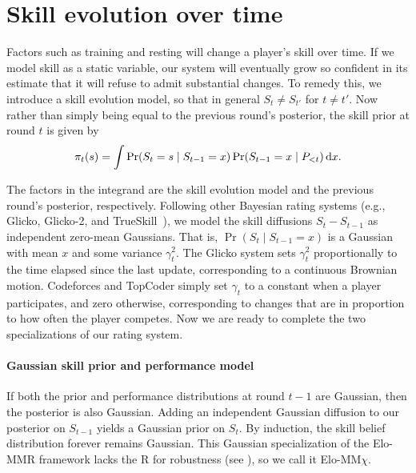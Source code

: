 \section{Skill evolution over time}
\label{sec:skill-drift}

Factors such as training and resting will change a player's skill over time. If we model skill as a static variable, our system will eventually grow so confident in its estimate that it will refuse to admit substantial changes. To remedy this, we introduce a skill evolution model, so that in general $S_t \neq S_{t'}$ for $t \neq t'$. Now rather than simply being equal to the previous round's posterior, the skill prior at round $t$ is given by
\begin{equation}
\label{eq:drift}
\pi_t(s) = \int \Pr(S_t = s \mid S_{t-1} = x) \Pr(S_{t-1} = x \mid P_{<t}) \,\mathrm{d}x.
\end{equation}

The factors in the integrand are the skill evolution model and the previous round's posterior, respectively. Following other Bayesian rating systems (e.g., Glicko, Glicko-2, and TrueSkill~\cite{G99, G12, HMG06}), we model the skill diffusions $S_t-S_{t-1}$ as independent zero-mean Gaussians. That is, $\Pr(S_t \mid S_{t-1}=x)$ is a Gaussian with mean $x$ and some variance $\gamma_t^2$. The Glicko system sets $\gamma_t^2$ proportionally to the time elapsed since the last update, corresponding to a continuous Brownian motion. Codeforces and TopCoder simply set $\gamma_t$ to a constant when a player participates, and zero otherwise, corresponding to changes that are in proportion to how often the player competes. Now we are ready to complete the two specializations of our rating system.

\paragraph{Gaussian skill prior and performance model}
If both the prior and performance distributions at round $t-1$ are Gaussian, then the posterior is also Gaussian. Adding an independent Gaussian diffusion to our posterior on $S_{t-1}$ yields a Gaussian prior on $S_t$. By induction, the skill belief distribution forever remains Gaussian. This Gaussian specialization of the Elo-MMR framework lacks the R for robustness (see ), so we call it Elo-MM$\chi$.

